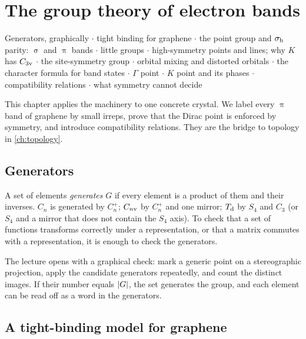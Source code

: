 \chapter{The group theory of electron bands}\label{ch:bands}

\begin{watch}{}
Generators, graphically  $\cdot$
tight binding for graphene  $\cdot$
the point group and $\sigma_{\mathrm{h}}$ parity: $\upsigma$ and $\uppi$ bands  $\cdot$
little groups  $\cdot$
high-symmetry points and lines; why $K$ has $C_{3\mathrm{v}}$  $\cdot$
the site-symmetry group  $\cdot$
orbital mixing and distorted orbitals  $\cdot$
the character formula for band states  $\cdot$
$\Gamma$ point  $\cdot$
$K$ point and its phases  $\cdot$
compatibility relations  $\cdot$
what symmetry cannot decide 
\end{watch}

This chapter applies the machinery to one concrete crystal. We label every $\uppi$ band
of graphene by small irreps, prove that the Dirac point is enforced by symmetry, and
introduce compatibility relations. They are the bridge to topology in
\cref{ch:topology}.

\section{Generators}\label{sec:generators}

A set of elements \emph{generates} $G$ if every element is a product of them and their
inverses. $C_n$ is generated by $C_n^+$; $C_{n\mathrm{v}}$ by $C_n^+$ and one mirror; $T_{\mathrm{d}}$ by
$S_4$ and $C_3$ (or $S_4$ and a mirror that does not contain the $S_4$ axis). To check
that a set of functions transforms correctly under a representation, or that a matrix
commutes with a representation, it is enough to check the generators.

The lecture opens with a graphical check: mark a generic point on a stereographic
projection, apply the candidate generators repeatedly, and count the distinct images.
If their number equals $\lvert G\rvert$, the set generates the group, and each element can be
read off as a word in the generators.

\section{A tight-binding model for graphene}

